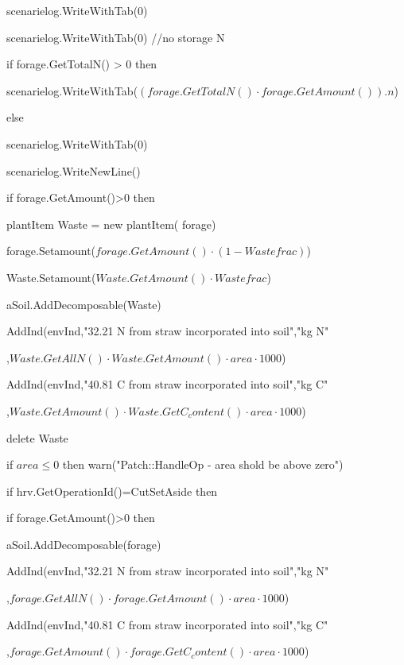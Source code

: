 \documentclass[%
]{scrartcl}
\begin{document}
{{{ \quad	scenarielog.WriteWithTab(0)

            scenarielog.WriteWithTab(0)    //no storage N
         	
if forage.GetTotalN() > 0 then

         \quad	 		 scenarielog.WriteWithTab($(forage.GetTotalN() \cdot forage.GetAmount()).n$)
         	
else
        	
 \quad 		scenarielog.WriteWithTab(0)
         
	scenarielog.WriteNewLine()


         	if forage.GetAmount()>0 then
         	
         	 \quad	plantItem  Waste = new plantItem( forage)
         	 
 \quad     forage.Setamount($forage.GetAmount() \cdot (1-Wastefrac)$)
         	 
\quad      Waste.Setamount($Waste.GetAmount() \cdot Wastefrac$)
         	
 \quad      aSoil.AddDecomposable(Waste)
         	
 \quad      AddInd(envInd,"32.21 N from straw incorporated into soil","kg N"

,$Waste.GetAllN() \cdot Waste.GetAmount() \cdot area \cdot 1000$)
         	
 \quad      AddInd(envInd,"40.81 C from straw incorporated into soil","kg C"

,$Waste.GetAmount() \cdot Waste.GetC_content() \cdot area \cdot 1000$)
         	 
\quad       delete Waste
         	


            if $area\le 0$ then
              warn("Patch::HandleOp - area shold be above zero")

            if hrv.GetOperationId()=CutSetAside then
             
          
 \quad  	if forage.GetAmount()>0 then
                
            \quad        \quad	aSoil.AddDecomposable(forage)
          
 \quad       \quad    AddInd(envInd,"32.21 N from straw incorporated into soil","kg N"

,$forage.GetAllN() \cdot forage.GetAmount() \cdot area \cdot 1000$)
        
\quad           \quad   AddInd(envInd,"40.81 C from straw incorporated into soil","kg C"

,$forage.GetAmount() \cdot forage.GetC_content() \cdot area \cdot 1000$)
      
}}}
\end{document}
